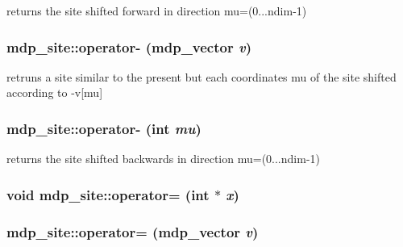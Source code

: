 returns the site shifted forward in direction mu=(0...ndim-\/1) \hypertarget{classmdp__site_a20d26e5db480233e64bde96eb67180fc}{
\subsubsection[{operator-\/}]{ mdp\_\-site::operator-\/ ({\bf mdp\_\-vector} {\em v})}}
\label{classmdp__site_a20d26e5db480233e64bde96eb67180fc}
retruns a site similar to the present but each coordinates mu of the site shifted according to -\/v\mbox{[}mu\mbox{]} \hypertarget{classmdp__site_a3dceebe7dec6a488314064cee7ef8d80}{
\subsubsection[{operator-\/}]{ mdp\_\-site::operator-\/ (int {\em mu})}}
\label{classmdp__site_a3dceebe7dec6a488314064cee7ef8d80}


returns the site shifted backwards in direction mu=(0...ndim-\/1) \hypertarget{classmdp__site_a8cf72becd9e8d125b31a5a40862bfa5a}{
\subsubsection[{operator=}]{\setlength{\rightskip}{0pt plus 5cm}void mdp\_\-site::operator= (int $\ast$ {\em x})}}
\label{classmdp__site_a8cf72becd9e8d125b31a5a40862bfa5a}
\hypertarget{classmdp__site_aa4931841d551417b526a2d2d22751471}{
\subsubsection[{operator=}]{ mdp\_\-site::operator= ({\bf mdp\_\-vector} {\em v})}}
\label{classmdp__site_aa4931841d551417b526a2d2d22751471}


